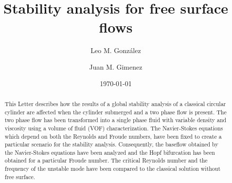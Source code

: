 \documentclass[%
 reprint,
 amsmath,amssymb,
 aps,
prl
]{revtex4-1}
\begin{document}

\title{Stability analysis for free surface flows}


\author{Leo M. Gonz\'alez}
%

\author{Juan M. Gimenez}
%

\date{\today}%
             
\begin{abstract}
This Letter describes how the results of a global stability analysis of a classical circular cylinder are affected when the cylinder submerged and a two phase flow is present. The two phase flow has been transformed into a single phase fluid with variable density and viscosity using a volume of fluid (VOF) characterization. The Navier-Stokes equations which depend on both the Reynolds and Froude numbers, have been fixed to create a particular scenario for the stability analysis. Consequently, the baseflow obtained by the Navier-Stokes equations have been analyzed and the Hopf bifurcation has been obtained for a particular Froude number. The critical Reynolds number and the frequency of the unstable mode have been compared to the classical solution without free surface.
\end{abstract}
\end{document}
